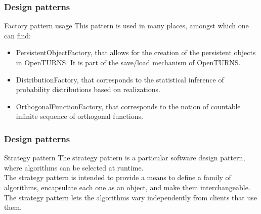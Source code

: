 \documentclass[8pt]{beamer}
\begin{document}
\begin{frame}
  \frametitle{Design patterns}
  \begin{block}{Factory pattern usage}
    This pattern is used in many places, amongst which one can find:
    \begin{itemize}
    \item \alert{PersistentObjectFactory}, that allows for the creation of the persistent objects in OpenTURNS. It is part of the save/load mechanism of OpenTURNS.
    \item \alert{DistributionFactory}, that corresponds to the statistical inference of probability distributions based on realizations.
    \item \alert{OrthogonalFunctionFactory}, that corresponds to the notion of countable infinite sequence of orthogonal functions.
    \end{itemize}
  \end{block}
\end{frame}

\begin{frame}
  \frametitle{Design patterns}
  \begin{block}{Strategy pattern}
    The \alert{strategy pattern} is a particular software design pattern, where algorithms can be selected at runtime.\\
    The strategy pattern is intended to provide a means to define a family of algorithms, encapsulate each one as an object, and make them interchangeable. The strategy pattern lets the algorithms vary independently from clients that use them.
  \end{block}
  \centering {}
\end{frame}
\end{document}
